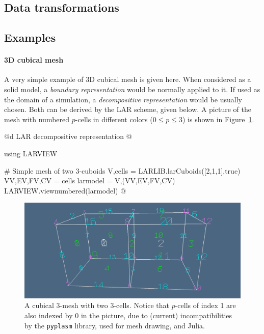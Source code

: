 \subsection{Data transformations}
\label{sec:transformations}


\subsection{Examples}
\label{sec:examples}

\paragraph{3D cubical mesh}

A very simple example of 3D cubical mesh is given here. When considered as a solid model,  a \emph{boundary representation} would be normally applied to it. If used as the domain of a simulation, a \emph{decompositive representation} would be usually chosen. Both can be derived by the LAR scheme, given below. A picture of the mesh with numbered $p$-cells in different colors ($0\leq p\leq 3$) is shown in Figure~\ref{fig:intro-1}.

@d LAR decompositive representation 
@{using LARVIEW

# Simple mesh of two 3-cuboids
V,cells = LARLIB.larCuboids([2,1,1],true)
VV,EV,FV,CV = cells
larmodel = V,(VV,EV,FV,CV)
LARVIEW.viewnumbered(larmodel)
@}

\begin{figure}[htbp] %
   \centering
   \includegraphics[width=\textwidth]{img/intro-1.pdf} 
   \caption{A cubical 3-mesh with two 3-cells. Notice that $p$-cells of index 1 are also indexed by 0 in the picture, due to (current) incompatibilities by the \texttt{pyplasm} library, used for mesh drawing, and Julia.}
   \label{fig:intro-1}
\end{figure}


